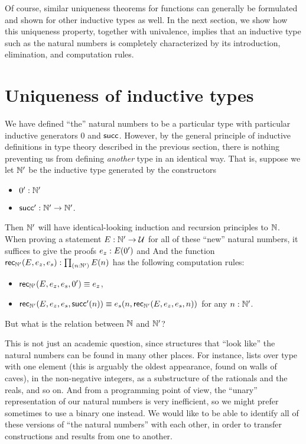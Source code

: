 Of course, similar uniqueness theorems for functions can generally be formulated and shown for other inductive types as well.
In the next section, we show how this uniqueness property, together with univalence, implies that an inductive type such as the natural numbers is completely characterized by its introduction, elimination, and computation rules.

%


\section{Uniqueness of inductive types}
\label{sec:appetizer-univalence}

%
We have defined ``the'' natural numbers to be a particular type \nat with particular inductive generators $0$ and $\mathsf{succ}$.
However, by the general principle of inductive definitions in type theory described in the previous section, there is nothing preventing us from defining \emph{another} type in an identical way.
That is, suppose we let $\mathbb{N}'$ be the inductive type generated by the constructors
\begin{itemize}
\item $0':\mathbb{N}'$
\item $\mathsf{succ}':\mathbb{N}'\to\mathbb{N}'$.
\end{itemize}
Then $\mathbb{N}'$ will have identical-looking induction and recursion principles to $\mathbb{N}$.
When proving a statement $E : \mathbb{N}' \to \mathcal{U}$ for all of these ``new'' natural numbers, it suffices to give the proofs $e_z : E(0')$ and 
And the function $\rec\natp(E,e_z,e_s) : \prd{n:\natp} E(n)$ has the following computation rules:
\begin{itemize}
\item $\mathsf{rec}_{\mathbb{N}'}(E,e_z,e_s,0') \equiv e_z$,
\item $\mathsf{rec}_{\mathbb{N}'}(E,e_z,e_s,\mathsf{succ}'(n)) \equiv e_s(n,\mathsf{rec}_{\mathbb{N}'}(E,e_z,e_s,n))$ for any $n : \mathbb{N}'$.
\end{itemize}
But what is the relation between $\mathbb{N}$ and $\mathbb{N}'$?

This is not just an academic question, since structures that ``look like'' the natural numbers can be found in many other places.
%
For instance, lists over type with one element (this is arguably the oldest appearance, found on walls of caves), in the non-negative integers, as a substructure of the rationals and the reals, and so on.
And from a programming point of view, the ``unary'' representation of our natural numbers is very inefficient, so we might prefer sometimes to use a binary one instead.
We would like to be able to identify all of these versions of ``the natural numbers'' with each other, in order to transfer constructions and results from one to another.

